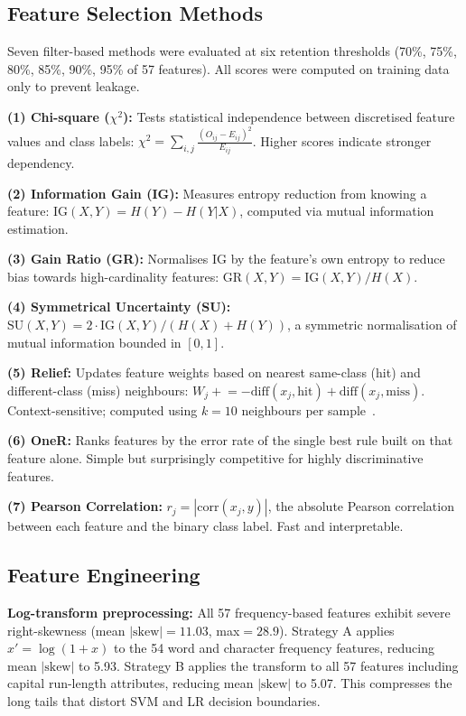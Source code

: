 \documentclass[conference]{IEEEtran}
\begin{document}
\subsection{Feature Selection Methods}

Seven filter-based methods were evaluated at six retention thresholds (70\%, 75\%, 80\%, 85\%, 90\%, 95\% of 57 features). All scores were computed on training data only to prevent leakage.

\textbf{(1) Chi-square ($\chi^2$):} Tests statistical independence between discretised feature values and class labels: $\chi^2 = \sum_{i,j} \frac{(O_{ij} - E_{ij})^2}{E_{ij}}$. Higher scores indicate stronger dependency.

\textbf{(2) Information Gain (IG):} Measures entropy reduction from knowing a feature: $\text{IG}(X,Y) = H(Y) - H(Y|X)$, computed via mutual information estimation.

\textbf{(3) Gain Ratio (GR):} Normalises IG by the feature's own entropy to reduce bias towards high-cardinality features: $\text{GR}(X,Y) = \text{IG}(X,Y) / H(X)$.

\textbf{(4) Symmetrical Uncertainty (SU):} $\text{SU}(X,Y) = 2 \cdot \text{IG}(X,Y) / (H(X) + H(Y))$, a symmetric normalisation of mutual information bounded in $[0,1]$.

\textbf{(5) Relief:} Updates feature weights based on nearest same-class (hit) and different-class (miss) neighbours: $W_j \mathrel{+}= -\text{diff}(x_j, \text{hit}) + \text{diff}(x_j, \text{miss})$. Context-sensitive; computed using $k=10$ neighbours per sample~\cite{ref9}.

\textbf{(6) OneR:} Ranks features by the error rate of the single best rule built on that feature alone. Simple but surprisingly competitive for highly discriminative features.

\textbf{(7) Pearson Correlation:} $r_j = |\text{corr}(x_j, y)|$, the absolute Pearson correlation between each feature and the binary class label. Fast and interpretable.

\subsection{Feature Engineering}
\label{sec:engineering}

\textbf{Log-transform preprocessing:} All 57 frequency-based features exhibit severe right-skewness (mean $|\text{skew}|=11.03$, max$=28.9$). Strategy A applies $x' = \log(1+x)$ to the 54 word and character frequency features, reducing mean $|\text{skew}|$ to 5.93. Strategy B applies the transform to all 57 features including capital run-length attributes, reducing mean $|\text{skew}|$ to 5.07. This compresses the long tails that distort SVM and LR decision boundaries.
\end{document}
